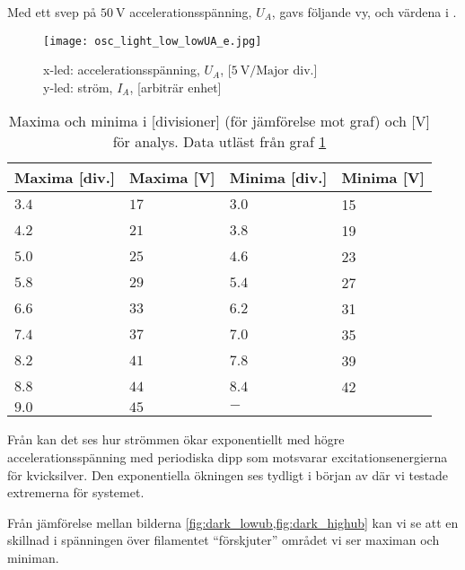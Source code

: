 Med ett svep på $50~\textrm{V}$ accelerationsspänning, $U_A$, gavs följande vy,  och värdena i .
\begin{figure}[h]
	\centering
	\texttt{[image: osc\_light\_low\_lowUA\_e.jpg]}
	\caption{x-led: accelerationsspänning, $U_A$, [$5~\textrm{V/Major div.}$]\\
			y-led: ström, $I_A$, [arbiträr enhet]}
	\label{fig:ollle}
\end{figure}

\begin{minipage}{\linewidth}
\begin{table}[H]
\centering
	\begin{tabular}{llll}
 	\textbf{Maxima [div.]}& \textbf{Maxima [V]}&\textbf{Minima [div.]}& \textbf{Minima [V]}\\\hline
	$3.4$&$17$&$3.0$&15\\
	$4.2$&$21$&$3.8$&19\\
	$5.0$&$25$&$4.6$&23\\
	$5.8$&$29$&$5.4$&27\\
	$6.6$&$33$&$6.2$&31\\
	$7.4$&$37$&$7.0$&35\\
	$8.2$&$41$&$7.8$&39\\
	$8.8$&$44$&$8.4$&42\\
	$9.0$&$45$&$ - $&
 	\end{tabular}
\caption{Maxima och minima i [divisioner] (för jämförelse mot graf) och [V] för analys. Data utläst från graf \cref{fig:ollle}}
\label{tab:maxmin}
\end{table}
\end{minipage}
\vspace{.5cm}

Från  kan det ses hur strömmen ökar exponentiellt med högre accelerationsspänning med periodiska dipp som motsvarar excitationsenergierna för kvicksilver. Den exponentiella ökningen ses tydligt i början av  där vi testade extremerna för systemet.

Från jämförelse mellan bilderna \cref{fig:dark_lowub,fig:dark_highub} kan vi se att en skillnad i spänningen över filamentet ``förskjuter'' området vi ser maximan och miniman. 

